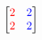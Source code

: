 \documentclass[preview]{standalone}
\begin{document}
\begin{align*}
\begin{bmatrix} {\color{red}2} & {\color{blue}2} \\ {\color{red}2} & {\color{blue}2} \end{bmatrix}
\end{align*}
\end{document}
